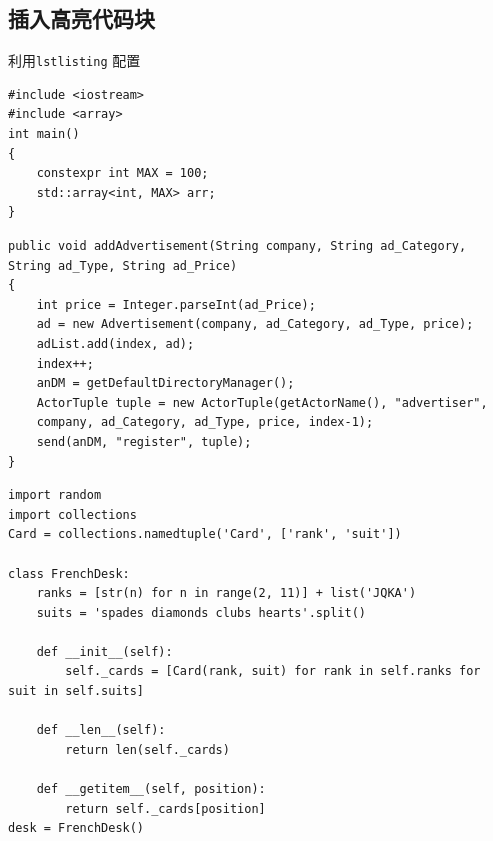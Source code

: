 \documentclass[12pt,hyperref,a4paper,UTF8,fontset=fandol]{ctexart}
\begin{document}
%
%
%
%
%
%

\subsection{插入高亮代码块}
利用\verb|lstlisting| 配置
\begin{lstlisting}[style=CPP, title="c++代码"]
#include <iostream>
#include <array>
int main()
{
    constexpr int MAX = 100;
    std::array<int, MAX> arr;
}  
\end{lstlisting}

\begin{lstlisting}[style=Java, title="Java代码"]
public void addAdvertisement(String company, String ad_Category, String ad_Type, String ad_Price)
{
    int price = Integer.parseInt(ad_Price);
    ad = new Advertisement(company, ad_Category, ad_Type, price);
    adList.add(index, ad);
    index++;
    anDM = getDefaultDirectoryManager();
    ActorTuple tuple = new ActorTuple(getActorName(), "advertiser",
    company, ad_Category, ad_Type, price, index-1);
    send(anDM, "register", tuple);
}
\end{lstlisting}

\begin{lstlisting}[style=Python, title="Python代码"]                
import random
import collections
Card = collections.namedtuple('Card', ['rank', 'suit'])

class FrenchDesk:
    ranks = [str(n) for n in range(2, 11)] + list('JQKA')
    suits = 'spades diamonds clubs hearts'.split()
    
    def __init__(self):
        self._cards = [Card(rank, suit) for rank in self.ranks for suit in self.suits]
        
    def __len__(self):
        return len(self._cards)
        
    def __getitem__(self, position):
        return self._cards[position]
desk = FrenchDesk()
\end{lstlisting}
\end{document}

